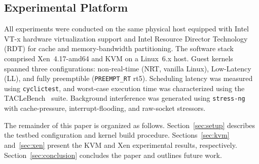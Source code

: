 \subsection{Experimental Platform}
\label{sec:platform}

All experiments were conducted on the same physical host equipped with Intel
VT-x hardware virtualization support and Intel Resource Director Technology
(RDT) for cache and memory-bandwidth partitioning.
The software stack comprised Xen~4.17-amd64 and KVM on a Linux~6.x host.
Guest kernels spanned three configurations: non-real-time (NRT, vanilla
Linux), Low-Latency (LL), and fully preemptible (\texttt{PREEMPT\_RT} rt5).
Scheduling latency was measured using \texttt{cyclictest}, and worst-case
execution time was characterized using the TACLeBench~\cite{taclebench} suite.
Background interference was generated using \texttt{stress-ng} with
cache-pressure, interrupt-flooding, and raw-socket stressors.

The remainder of this paper is organized as follows.
Section~\ref{sec:setup} describes the testbed configuration and kernel build
procedure.
Sections~\ref{sec:kvm} and~\ref{sec:xen} present the KVM and Xen experimental
results, respectively.
Section~\ref{sec:conclusion} concludes the paper and outlines future work.
